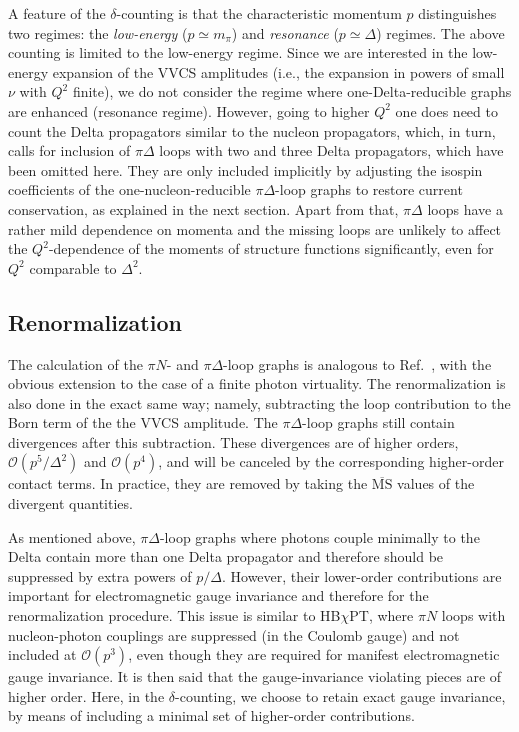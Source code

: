 \documentclass[12pt,preprint,tightenlines,
showpacs,preprintnumbers,amsmath,amssymb,
a4paper,nofootinbib]{revtex4-2}
\begin{document}
A feature of the $\delta$-counting is that the characteristic momentum
$p$ distinguishes two regimes: the {\it low-energy} ($p\simeq m_\pi$) and 
{\it resonance} ($p\simeq \varDelta$) regimes. The above counting is limited to the 
low-energy regime.
Since we are interested in the low-energy expansion of the  VVCS amplitudes (i.e., the expansion in powers of small $\nu$ with $Q^2$ finite),
we do not consider the regime where one-Delta-reducible graphs are enhanced (resonance regime).
However, going to higher $Q^2$ one does need to count the 
Delta propagators similar to the nucleon propagators, which, in turn, calls for inclusion
of $\pi \Delta$ loops with two and three Delta propagators, which have been omitted here. They are only included implicitly 
 by adjusting the isospin coefficients of the one-nucleon-reducible $\pi \Delta$-loop graphs to restore current conservation, as explained in the next section. Apart from that, $\pi \Delta$ loops have a rather mild
dependence on momenta and the missing loops are unlikely to  affect the
$Q^2$-dependence of the moments of structure functions significantly, even for $Q^2$ comparable to $\varDelta^2$. 



\subsection{Renormalization}

The calculation of the $\pi N$- and $\pi\Delta$-loop graphs is analogous to Ref.~\cite{Lensky:2009uv}, with the obvious extension to the case of a finite photon virtuality. The renormalization is also done in the exact same way; 
namely, 
subtracting the loop contribution to the Born term of the the VVCS amplitude.
The $\pi \Delta$-loop graphs
still contain divergences after this subtraction. These divergences are of higher orders, $\mathcal{O}(p^5/\varDelta^2)$ and  $\mathcal{O}(p^4)$,
and will be canceled by the corresponding higher-order
contact terms. In practice, they are removed by taking the $\overline{\text{MS}}$ values of the divergent quantities.

As mentioned above, $\pi \Delta$-loop graphs where photons couple minimally to the Delta contain more 
than one Delta propagator and therefore should be suppressed by extra powers of $p/\varDelta$.
However, their lower-order contributions are important for electromagnetic gauge invariance and therefore for the renormalization procedure. This issue is similar to HB$\chi$PT, where $\pi N$ loops with nucleon-photon couplings are suppressed (in the Coulomb gauge) and not included at $\mathcal{O}(p^3)$, even though they are required for manifest electromagnetic gauge invariance. It is then said that the gauge-invariance violating pieces are of higher order. Here, in the $\delta$-counting, we choose to retain exact gauge invariance, by means of including a minimal set of higher-order contributions. 
\end{document}
